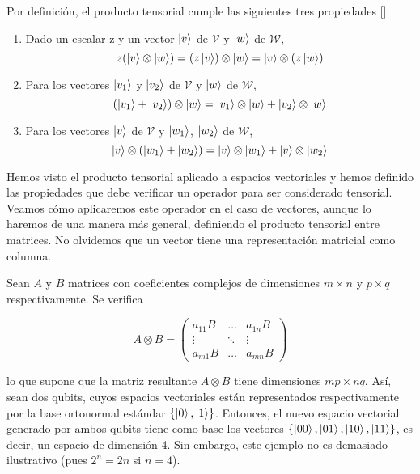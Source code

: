 Por definición, el producto tensorial cumple las siguientes tres propiedades [\cite{nielsen2001quantum}]:
\begin{enumerate}
\item Dado un escalar z y un vector $\left|v\right\rangle$ de $\mathcal{V}$ y $\left|w\right\rangle$ de $\mathcal{W}$,\\
\begin{equation}
z(\left|v\right\rangle\otimes\left|w\right\rangle)= (z\left|v\right\rangle)\otimes\left|w\right\rangle = \left|v\right\rangle\otimes (z\left|w\right\rangle)
\end{equation}

\item Para los vectores $\left|v_1\right\rangle$  y $\left|v_2\right\rangle$ de $\mathcal{V}$ y $\left|w\right\rangle$ de $\mathcal{W}$,\\
\begin{equation}
(\left|v_1\right\rangle+\left|v_2\right\rangle)\otimes\left|w\right\rangle=\left|v_1\right\rangle\otimes\left|w\right\rangle+\left|v_2\right\rangle\otimes\left|w\right\rangle
\end{equation}

\item Para los vectores $\left|v\right\rangle$ de $\mathcal{V}$ y $\left|w_1\right\rangle$, $\left|w_2\right\rangle$ de $\mathcal{W}$,\\
\begin{equation}
\left|v\right\rangle\otimes (\left|w_1\right\rangle+\left|w_2\right\rangle) = \left|v\right\rangle\otimes\left|w_1\right\rangle +\left|v\right\rangle\otimes\left|w_2\right\rangle 
\end{equation}
\end{enumerate}

Hemos visto el producto tensorial aplicado a espacios vectoriales y hemos definido las propiedades que debe verificar un operador para ser considerado tensorial. Veamos cómo aplicaremos este operador en el caso de vectores, aunque lo haremos de una manera más general, definiendo el producto tensorial entre matrices. No olvidemos que un vector tiene una representación matricial como columna.

Sean $A$ y $B$ matrices con coeficientes complejos de dimensiones $m\times n$ y $p\times q$ respectivamente. Se verifica

\begin{equation}
A\otimes B=\left(\begin{matrix}
a_{11}B & \hdots & a_{1n}B \\
\vdots & \ddots & \vdots \\
a_{m1}B & \hdots & a_{mn}B
\end{matrix}\right)
\end{equation}

lo que supone que la matriz resultante $A\otimes B$ tiene dimensiones $mp\times nq$. Así, sean dos qubits, cuyos espacios vectoriales están representados respectivamente por la base ortonormal estándar $\{\left|0\right\rangle,\left|1\right\rangle\}$. Entonces, el nuevo espacio vectorial 
generado por ambos qubits tiene como base los vectores $\{\left|00\right\rangle,\left|01\right\rangle,\left|10\right\rangle,\left|11\right\rangle\}$, es decir, un espacio de dimensión 4. Sin embargo, este ejemplo no es demasiado ilustrativo (pues $2^n = 2n$ si $n=4$).

